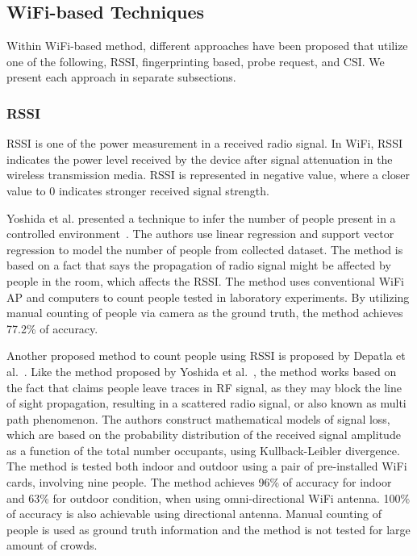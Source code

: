 	\subsection{WiFi-based Techniques} %
	\label{sub:wifi-based-techniques}
	Within WiFi-based method, different approaches have been proposed that utilize one of the following, \ac{RSSI}, fingerprinting based, probe request, and \ac{CSI}. We present each approach in separate subsections.


	\subsubsection{RSSI} %
	\label{ssub:rssi}
	\ac{RSSI} is one of the power measurement in a received radio signal. In WiFi, \ac{RSSI} indicates the power level received by the device after signal attenuation in the wireless transmission media. \ac{RSSI} is represented in negative value, where a closer value to 0 indicates stronger received signal strength.

	Yoshida et al. presented a technique to infer the number of people present in a controlled environment~\cite{thesis052}. The authors use linear regression and support vector regression to model the number of people from collected dataset. The method is based on a fact that says the propagation of radio signal might be affected by people in the room, which affects the \ac{RSSI}. The method uses conventional WiFi \ac{AP} and computers to count people tested in laboratory experiments. By utilizing manual counting of people via camera as the ground truth, the method achieves 77.2\% of accuracy.

	Another proposed method to count people using \ac{RSSI} is proposed by Depatla et al.~\cite{thesis046}. Like the method proposed by Yoshida et al.~\cite{thesis052}, the method works based on the fact that claims people leave traces in \ac{RF} signal, as they may block the line of sight propagation, resulting in a scattered radio signal, or also known as multi path phenomenon. The authors construct mathematical models of signal loss, which are based on the probability distribution of the received signal amplitude as a function of the total number occupants, using Kullback-Leibler divergence. The method is tested both indoor and outdoor using a pair of pre-installed WiFi cards, involving nine people. The method achieves 96\% of accuracy for indoor and 63\% for outdoor condition, when using omni-directional WiFi antenna. 100\% of accuracy is also achievable using directional antenna. Manual counting of people is used as ground truth information and the method is not tested for large amount of crowds.

